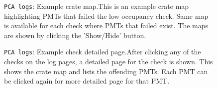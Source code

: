 \documentclass[12pt]{article}
\begin{document}
\begin{figure}
\centering
\noindent{}
  \caption{\centering \texttt{PCA logs}: Example crate map.\hspace{\textwidth}This is an example crate map highlighting PMTs that failed the low occupancy check. Same map is available for each check where PMTs that failed exist. The maps are shown by clicking the 'Show/Hide' button.}
  \label{fig:log1}
\end{figure}

\begin{figure}
\centering
\noindent{}
  \caption{\centering \texttt{PCA logs}: Example check detailed page.\hspace{\textwidth}After clicking any of the checks on the log pages, a detailed page for the check is shown. This shows the crate map and lists the offending PMTs. Each PMT can be clicked again for more detailed page for that PMT.}
  \label{fig:log2}
\end{figure}
\end{document}
